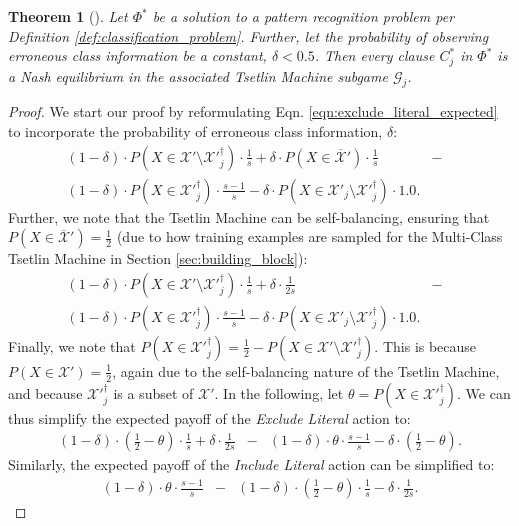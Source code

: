 \documentclass[11pt,a4paper]{article}
\newtheorem{mytheorem}{Theorem}
\begin{document}
\begin{mytheorem}[]\label{theorem:nash_equilibrium}
Let $\Phi^*$ be a solution to a pattern recognition problem per Definition \ref{def:classification_problem}. Further, let the probability of observing erroneous class information be a constant, $\delta < 0.5$. Then every clause $C^*_j$ in $\Phi^*$ is a Nash equilibrium in the associated Tsetlin Machine subgame $\mathcal{G}_j$.
\end{mytheorem}
\begin{proof}

We start our proof by reformulating Eqn. \ref{eqn:exclude_literal_expected} to incorporate the probability of erroneous class information, $\delta$:
\begin{eqnarray}
(1 - \delta) \cdot P(X \in \mathcal{X}' \setminus \mathcal{X}'^{\dagger}_j) \cdot \frac{1}{s} + \delta \cdot P(X \in \overline{\mathcal{X}}') \cdot \frac{1}{s}
 &-&\nonumber\\
(1 - \delta) \cdot P(X \in \mathcal{X}'^{\dagger}_j) \cdot \frac{s-1}{s} - \delta \cdot P(X \in \mathcal{X}'_j \setminus \mathcal{X}'^\dagger_j) \cdot 1.0.
\end{eqnarray}
Further, we note that the Tsetlin Machine can be self-balancing, ensuring that $P(X \in \overline{\mathcal{X}}') = \frac{1}{2}$ (due to how training examples are sampled for the Multi-Class Tsetlin Machine in Section \ref{sec:building_block}):
\begin{eqnarray}
(1 - \delta) \cdot P(X \in \mathcal{X}' \setminus \mathcal{X}'^{\dagger}_j) \cdot \frac{1}{s} + \delta \cdot \frac{1}{2s}
 &-&\nonumber\\
(1 - \delta) \cdot P(X \in \mathcal{X}'^{\dagger}_j) \cdot \frac{s-1}{s} - \delta \cdot P(X \in \mathcal{X}'_j \setminus \mathcal{X}'^\dagger_j) \cdot 1.0.
\end{eqnarray}
Finally, we note that $P(X \in \mathcal{X}'^{\dagger}_j) = \frac{1}{2} - P(X \in \mathcal{X}' \setminus \mathcal{X}'^{\dagger}_j)$. This is because $P(X \in \mathcal{X}') = \frac{1}{2}$, again due to the self-balancing nature of the Tsetlin Machine, and because $\mathcal{X}'^{\dagger}_j$ is a subset of $\mathcal{X}'$. In the following, let $\theta = P(X \in \mathcal{X}'^{\dagger}_j)$. We can thus simplify the expected payoff of the \emph{Exclude Literal} action to:
\begin{eqnarray}
(1 - \delta) \cdot \left(\frac{1}{2} -\theta\right) \cdot \frac{1}{s} + \delta \cdot \frac{1}{2s}
 &-& (1 - \delta) \cdot \theta \cdot \frac{s-1}{s} - \delta \cdot \left(\frac{1}{2} -\theta\right).
\end{eqnarray}
Similarly, the expected payoff of the \emph{Include Literal} action can be simplified to:
\begin{eqnarray}
(1 - \delta) \cdot \theta \cdot \frac{s-1}{s} 
 &-& (1 - \delta) \cdot \left(\frac{1}{2} -\theta\right) \cdot \frac{1}{s} - \delta \cdot \frac{1}{2s}.
\end{eqnarray}


\end{proof}
\end{document}
